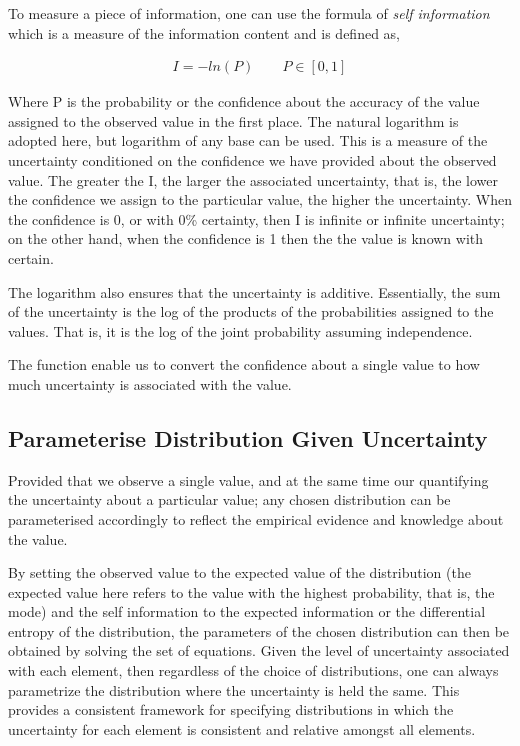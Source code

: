 \documentclass[nojss]{jss}\usepackage[]{graphicx}\usepackage[]{color}
\begin{document}
To measure a piece of information, one can use the formula of
\textit{self information} which is a measure of the information
content and is defined as,

\begin{align}
  \label{eqn:si}
  I = -ln(P) \qquad P \in [0, 1]
\end{align}


Where P is the probability or the confidence about the accuracy of the
value assigned to the observed value in the first place. The natural
logarithm is adopted here, but logarithm of any base can be used. This
is a measure of the uncertainty conditioned on the confidence we have
provided about the observed value. The greater the I, the larger the
associated uncertainty, that is, the lower the confidence we assign to
the particular value, the higher the uncertainty. When the confidence
is 0, or with 0\% certainty, then I is infinite or infinite
uncertainty; on the other hand, when the confidence is 1 then the the
value is known with certain.

The logarithm also ensures that the uncertainty is
additive. Essentially, the sum of the uncertainty is the log of the
products of the probabilities assigned to the values. That is, it is
the log of the joint probability assuming independence.

The function enable us to convert the confidence about a single value
to how much uncertainty is associated with the value.




\subsection{Parameterise Distribution Given Uncertainty}


Provided that we observe a single value, and at the same time our
quantifying the uncertainty about a particular value; any chosen
distribution can be parameterised accordingly to reflect the empirical
evidence and knowledge about the value.

By setting the observed value to the expected value of the
distribution (the expected value here refers to the value with the
highest probability, that is, the mode) and the self information to
the expected information or the differential entropy of the
distribution, the parameters of the chosen distribution can then be
obtained by solving the set of equations. Given the level of
uncertainty associated with each element, then regardless of the
choice of distributions, one can always parametrize the distribution
where the uncertainty is held the same. This provides a consistent
framework for specifying distributions in which the uncertainty for
each element is consistent and relative amongst all elements.
\end{document}
